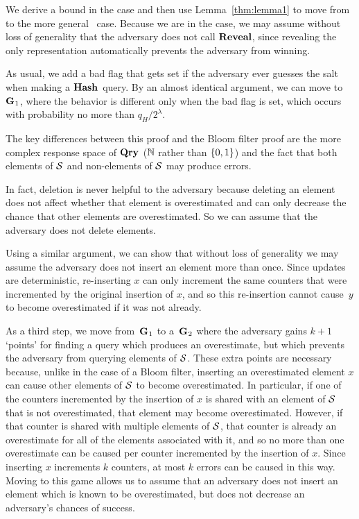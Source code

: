 We derive a bound in the  case and then use Lemma~\ref{thm:lemma1} to
move from  to the more general \erreps\ case. Because we are in the
 case, we may assume without loss of generality that the adversary does
not call $\mathbf{Reveal}$, since revealing the only representation automatically prevents
the adversary from winning.

As usual, we add a
bad flag that gets set if the adversary ever guesses the salt when making
a $\textup{\textbf{Hash}}\hspace{0.5pt}$ query. By an almost identical argument, we can
move to~$\textup{\textbf{G}}\hspace{0.5pt}_1$, where the behavior is different only when the bad flag
is set, which occurs with probability no more than $q_H/2^\lambda$.

The key differences between this proof and the Bloom filter proof are the more
complex response space of $\textup{\textbf{Qry}}\hspace{0.5pt}$ ($\mathbb{N}$ rather than $\{0,1\}$) and the fact that
both elements of $\mathcal{S}$ and non-elements of $\mathcal{S}$ may produce errors.

In fact, deletion is never helpful to the adversary because deleting an element
does not affect whether that element is overestimated and can only decrease the
chance that other elements are overestimated. So we can assume that the
adversary does not delete elements.

Using a similar argument, we can show that without loss of generality we may
assume the adversary does not insert an element more than once. Since updates are
deterministic, re-inserting $x$ can only increment the same counters that were
incremented by the original insertion of $x$, and so this re-insertion cannot
cause~$y$ to become overestimated if it was not already.

As a third step, we move from~$\textup{\textbf{G}}\hspace{0.5pt}_1$ to a~$\textup{\textbf{G}}\hspace{0.5pt}_2$ where the adversary gains
$k+1$ `points' for finding a query which produces an
overestimate, but which prevents the adversary from querying elements of $\mathcal{S}$.
These extra points are necessary because, unlike in the case of a Bloom
filter, inserting an overestimated element $x$ can cause other elements of
$\mathcal{S}$ to become overestimated. In particular, if one of the counters
incremented by the insertion of $x$ is shared with an element of $\mathcal{S}$ that is
not overestimated, that element may become overestimated. However, if that
counter is shared with multiple elements of $\mathcal{S}$, that counter is already an
overestimate for all of the elements associated with it, and so no more than one
overestimate can be caused per counter incremented by the insertion of $x$.
Since inserting $x$ increments $k$ counters, at most $k$ errors can be caused in
this way. Moving to this game allows us to assume that an adversary does not
insert an element which is known to be overestimated, but does not decrease an
adversary's chances of success.

